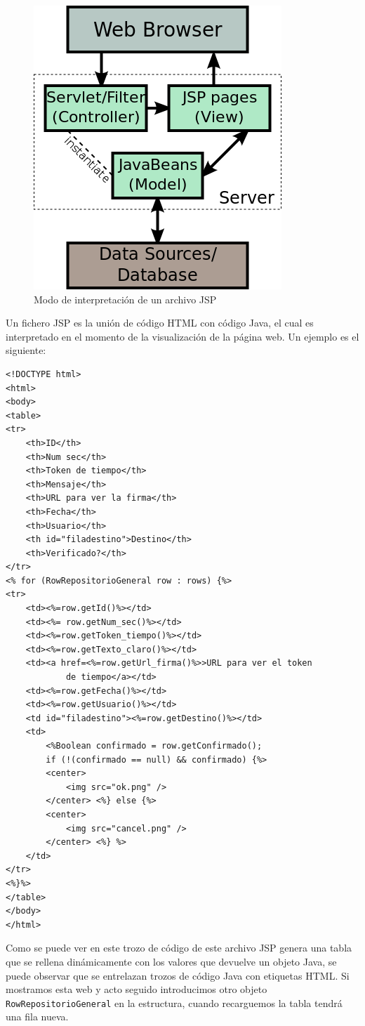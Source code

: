 \begin{itemize}
\begin{figure}
  \centering
    \includegraphics[scale=0.5]{./GoogleAppEngine/imagenes/JSP_Model.png}
  \caption{Modo de interpretación de un archivo JSP}
  \label{fig:modoJSP}
\end{figure}

Un fichero JSP es la unión de código HTML con código Java, el cual es interpretado en el momento de la visualización de la página web. Un ejemplo es el siguiente:
 
\begin{lstlisting}[style=HTML]   
<!DOCTYPE html>
<html>
<body>
<table>
<tr>
	<th>ID</th>
	<th>Num sec</th>
	<th>Token de tiempo</th>
	<th>Mensaje</th>
	<th>URL para ver la firma</th>
	<th>Fecha</th>
	<th>Usuario</th>
	<th id="filadestino">Destino</th>
	<th>Verificado?</th>
</tr>
<% for (RowRepositorioGeneral row : rows) {%>
<tr>
	<td><%=row.getId()%></td>
	<td><%= row.getNum_sec()%></td>
	<td><%=row.getToken_tiempo()%></td>
	<td><%=row.getTexto_claro()%></td>
	<td><a href=<%=row.getUrl_firma()%>>URL para ver el token
			de tiempo</a></td>
	<td><%=row.getFecha()%></td>
	<td><%=row.getUsuario()%></td>
	<td id="filadestino"><%=row.getDestino()%></td>
	<td>
		<%Boolean confirmado = row.getConfirmado();
		if (!(confirmado == null) && confirmado) {%>
		<center>
			<img src="ok.png" />
		</center> <%} else {%>
		<center>
			<img src="cancel.png" />
		</center> <%} %>
	</td>
</tr>
<%}%>
</table>
</body>
</html>
\end{lstlisting}

Como se puede ver en este trozo de código de este archivo JSP genera una tabla que se rellena dinámicamente con los valores que devuelve un objeto Java, se puede observar que se entrelazan trozos de código Java con etiquetas HTML. Si mostramos esta web y acto seguido introducimos otro objeto \lstinline{RowRepositorioGeneral} en la estructura, cuando recarguemos la tabla tendrá una fila nueva.


\end{itemize}
